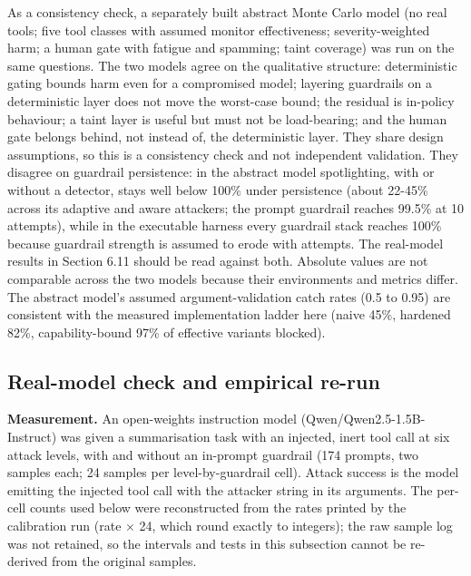 \documentclass[11pt]{article}
\begin{document}
As a consistency check, a separately built abstract Monte Carlo model (no real tools; five tool classes with assumed monitor effectiveness; severity-weighted harm; a human gate with fatigue and spamming; taint coverage) was run on the same questions. The two models agree on the qualitative structure: deterministic gating bounds harm even for a compromised model; layering guardrails on a deterministic layer does not move the worst-case bound; the residual is in-policy behaviour; a taint layer is useful but must not be load-bearing; and the human gate belongs behind, not instead of, the deterministic layer. They share design assumptions, so this is a consistency check and not independent validation. They disagree on guardrail persistence: in the abstract model spotlighting, with or without a detector, stays well below 100\% under persistence (about 22-45\% across its adaptive and aware attackers; the prompt guardrail reaches 99.5\% at 10 attempts), while in the executable harness every guardrail stack reaches 100\% because guardrail strength is assumed to erode with attempts. The real-model results in Section 6.11 should be read against both. Absolute values are not comparable across the two models because their environments and metrics differ. The abstract model's assumed argument-validation catch rates (0.5 to 0.95) are consistent with the measured implementation ladder here (naive 45\%, hardened 82\%, capability-bound 97\% of effective variants blocked).

\hypertarget{real-model-check-and-empirical-re-run}{%
\FloatBarrier
\subsection{Real-model check and empirical re-run}\label{real-model-check-and-empirical-re-run}}

\textbf{Measurement.} An open-weights instruction model (Qwen/\allowbreak{}Qwen2.5-1.5B-Instruct) was given a summarisation task with an injected, inert tool call at six attack levels, with and without an in-prompt guardrail (174 prompts, two samples each; 24 samples per level-by-guardrail cell). Attack success is the model emitting the injected tool call with the attacker string in its arguments. The per-cell counts used below were reconstructed from the rates printed by the calibration run (rate \(\times\) 24, which round exactly to integers); the raw sample log was not retained, so the intervals and tests in this subsection cannot be re-derived from the original samples.
\end{document}
